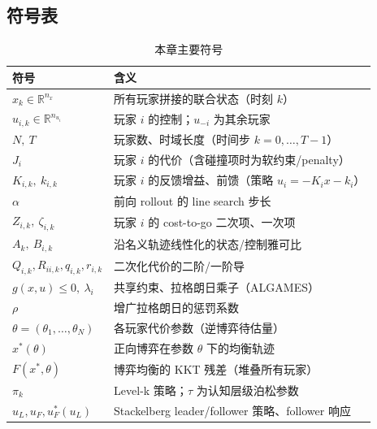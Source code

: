 \subsection*{符号表}
\begin{table}[H]\centering\small
\caption{本章主要符号}
\label{tab:rtg-symbols}
\begin{tabular}{ll}
\toprule
符号 & 含义 \\
\midrule
$x_k\in\mathbb{R}^{n_x}$ & 所有玩家拼接的联合状态（时刻 $k$） \\
$u_{i,k}\in\mathbb{R}^{n_{u_i}}$ & 玩家 $i$ 的控制；$u_{-i}$ 为其余玩家 \\
$N,\ T$ & 玩家数、时域长度（时间步 $k=0,\dots,T-1$） \\
$J_i$ & 玩家 $i$ 的代价（含碰撞项时为软约束/penalty） \\
$K_{i,k},\ k_{i,k}$ & 玩家 $i$ 的反馈增益、前馈（策略 $u_i=-K_ix-k_i$） \\
$\alpha$ & 前向 rollout 的 line search 步长 \\
$Z_{i,k},\ \zeta_{i,k}$ & 玩家 $i$ 的 cost-to-go 二次项、一次项 \\
$A_k,\ B_{i,k}$ & 沿名义轨迹线性化的状态/控制雅可比 \\
$Q_{i,k},R_{ii,k},q_{i,k},r_{i,k}$ & 二次化代价的二阶/一阶导 \\
$g(x,u)\le0,\ \lambda_i$ & 共享约束、拉格朗日乘子（ALGAMES） \\
$\rho$ & 增广拉格朗日的惩罚系数 \\
$\theta=(\theta_1,\dots,\theta_N)$ & 各玩家代价参数（逆博弈待估量） \\
$x^*(\theta)$ & 正向博弈在参数 $\theta$ 下的均衡轨迹 \\
$F(x^*,\theta)$ & 博弈均衡的 KKT 残差（堆叠所有玩家） \\
$\pi_k$ & Level-k 策略；$\tau$ 为认知层级泊松参数 \\
$u_L,u_F,u_F^*(u_L)$ & Stackelberg leader/follower 策略、follower 响应 \\
\bottomrule
\end{tabular}
\end{table}

